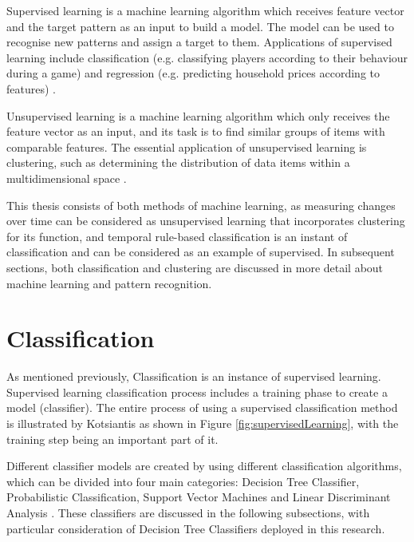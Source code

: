 Supervised learning is a machine learning algorithm which receives feature vector and the target pattern as an input to build a model. The model can be used to recognise new patterns and assign a target to them. Applications of supervised learning include classification (e.g. classifying players according to their behaviour during a game) and regression (e.g. predicting household prices according to features) \cite{Bishop2006}.

Unsupervised learning is a machine learning algorithm which only receives the feature vector as an input, and its task is to find similar groups of items with comparable features. The essential application of unsupervised learning is clustering, such as determining the distribution of data items within a multidimensional space \cite{Bishop2006}.

This thesis consists of both methods of machine learning, as measuring changes over time can be considered as unsupervised learning that incorporates clustering for its function, and temporal rule-based classification is an instant of classification and can be considered as an example of supervised. In subsequent sections, both classification and clustering are discussed in more detail about machine learning and pattern recognition.


\section{Classification}
As mentioned previously, Classification is an instance of supervised learning. Supervised learning classification process includes a training phase to create a model (classifier). The entire process of using a supervised classification method is illustrated by Kotsiantis \cite{Kotsiantis2007} as shown in Figure \ref{fig:supervisedLearning}, with the training step being an important part of it. 

Different classifier models are created by using different classification algorithms, which can be divided into four main categories: Decision Tree Classifier, Probabilistic Classification, Support Vector Machines and Linear Discriminant Analysis \cite{Zaki2014}. These classifiers are discussed in the following subsections, with particular consideration of Decision Tree Classifiers deployed in this research.

